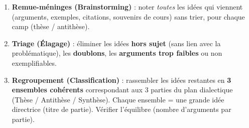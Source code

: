 \documentclass[11pt]{article}
\begin{document}
\begin{methode}
\begin{enumerate}
\item \textbf{Remue-méninges (Brainstorming)} : noter \emph{toutes} les idées qui viennent (arguments, exemples, citations, souvenirs de cours) sans trier, pour chaque camp (thèse / antithèse).
\item \textbf{Triage (Élagage)} : éliminer les idées \textbf{hors sujet} (sans lien avec la problématique), les \textbf{doublons}, les \textbf{arguments trop faibles} ou non exemplifiables.
\item \textbf{Regroupement (Classification)} : rassembler les idées restantes en \textbf{3 ensembles cohérents} correspondant aux 3 parties du plan dialectique (Thèse / Antithèse / Synthèse). Chaque ensemble = une grande idée directrice (titre de partie). Vérifier l'équilibre (nombre d'arguments par partie).
\end{enumerate}
\end{methode}
\end{document}
